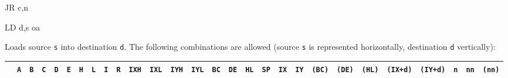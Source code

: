 \documentclass[12pt,twoside,openright,a4paper]{book}
\begin{document}
\begin{basedescript}{
	\desclabelstyle{\multilinelabel}
	\desclabelwidth{3cm}}
\begin{DetailItem}{JR c,n}
	\end{DetailItem}

	\pagebreak
	\begin{DetailItem}{LD d,s}
		{oa}
		{}

		Loads source {\tt s} into destination {\tt d}. The following combinations are allowed (source {\tt s} is represented horizontally, destination {\tt d} vertically):

		{
			\fontsize{9pt}{9pt}	%
			\setlength{\tabcolsep}{1pt}
			\newcommand{\X}{$\bullet$}
			\newcommand{\n}{\cellcolor{llgray}}

			\begin{tabular}{@{}|c|c|c|c|c|c|c|c|c|c|c|c|c|c|c|c|c|c|c|c|c|c|c|c|c|c|c|c|}
				\arrayrulecolor{gray}
				\hline
				& {\tt A} & {\tt B} & {\tt C} & {\tt D} & {\tt E} & {\tt H} & {\tt L} & {\tt I} & {\tt R} & {\tt IXH} & {\tt IXL} & {\tt IYH} & {\tt IYL} & {\tt BC} & {\tt DE} & {\tt HL} & {\tt SP} & {\tt IX} & {\tt IY} & {\tt (BC)} & {\tt (DE)} & {\tt (HL)} & {\tt (IX+d)} & {\tt (IY+d)} & {\tt n} & {\tt nn} & {\tt (nn)} \\
				\hline


\end{tabular}}
\end{DetailItem}
\end{basedescript}
\end{document}
